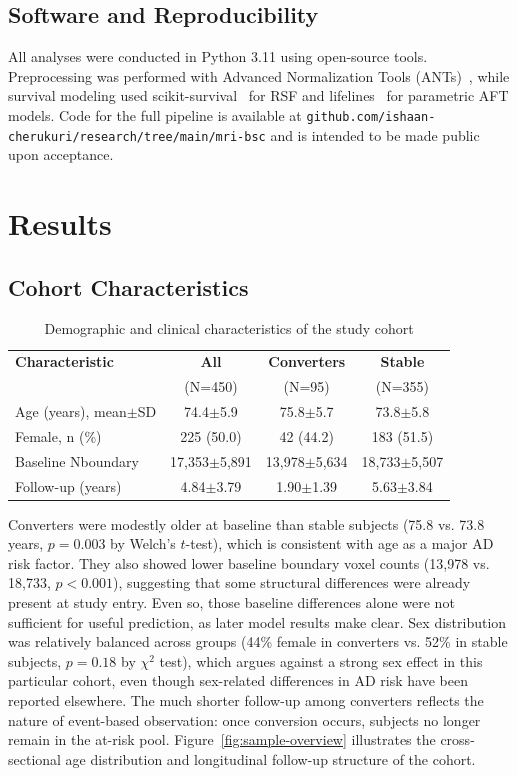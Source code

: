 \documentclass[blue]{ludusofficial}
\begin{document}
\subsection{Software and Reproducibility}

All analyses were conducted in Python 3.11 using open-source tools. Preprocessing was performed with Advanced Normalization Tools (ANTs)~\cite{avants2011ants}, while survival modeling used scikit-survival~\cite{polsterl2020sksurv} for RSF and lifelines~\cite{davidson-pilon2019lifelines} for parametric AFT models. Code for the full pipeline is available at \texttt{github.com/ishaan-cherukuri/research/tree/main/mri-bsc} and is intended to be made public upon acceptance.

\section{Results}

\subsection{Cohort Characteristics}

\begin{table}[t!]
\centering
\caption{Demographic and clinical characteristics of the study cohort}
\label{tab:demographics}
\begin{tabular}{lccc}
\hline
\textbf{Characteristic} & \textbf{All} & \textbf{Converters} & \textbf{Stable} \\
 & (N=450) & (N=95) & (N=355) \\
\hline
Age (years), mean$\pm$SD & 74.4$\pm$5.9 & 75.8$\pm$5.7 & 73.8$\pm$5.8 \\
Female, n (\%) & 225 (50.0) & 42 (44.2) & 183 (51.5) \\
Baseline Nboundary & 17,353$\pm$5,891 & 13,978$\pm$5,634 & 18,733$\pm$5,507 \\
Follow-up (years) & 4.84$\pm$3.79 & 1.90$\pm$1.39 & 5.63$\pm$3.84 \\
\hline
\end{tabular}
\end{table}

Converters were modestly older at baseline than stable subjects (75.8 vs. 73.8 years, $p=0.003$ by Welch's $t$-test), which is consistent with age as a major AD risk factor. They also showed lower baseline boundary voxel counts (13,978 vs. 18,733, $p<0.001$), suggesting that some structural differences were already present at study entry. Even so, those baseline differences alone were not sufficient for useful prediction, as later model results make clear. Sex distribution was relatively balanced across groups (44\% female in converters vs. 52\% in stable subjects, $p=0.18$ by $\chi^2$ test), which argues against a strong sex effect in this particular cohort, even though sex-related differences in AD risk have been reported elsewhere. The much shorter follow-up among converters reflects the nature of event-based observation: once conversion occurs, subjects no longer remain in the at-risk pool. Figure~\ref{fig:sample-overview} illustrates the cross-sectional age distribution and longitudinal follow-up structure of the cohort.
\end{document}

